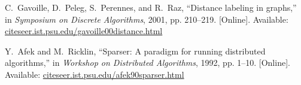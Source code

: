 \documentclass[twocolumn]{article}
\begin{document}
\begin{thebibliography}{10}
\BIBentryALTinterwordspacing
C.~Gavoille, D.~Peleg, S.~Perennes, and R.~Raz, ``Distance labeling in
  graphs,'' in \emph{Symposium on Discrete Algorithms}, 2001, pp. 210--219.
  [Online]. Available: \url{citeseer.ist.psu.edu/gavoille00distance.html}
\BIBentrySTDinterwordspacing

\BIBentryALTinterwordspacing
Y.~Afek and M.~Ricklin, ``Sparser: A paradigm for running distributed
  algorithms,'' in \emph{Workshop on Distributed Algorithms}, 1992, pp. 1--10.
  [Online]. Available: \url{citeseer.ist.psu.edu/afek90sparser.html}
\BIBentrySTDinterwordspacing

\end{thebibliography}
\end{document}
